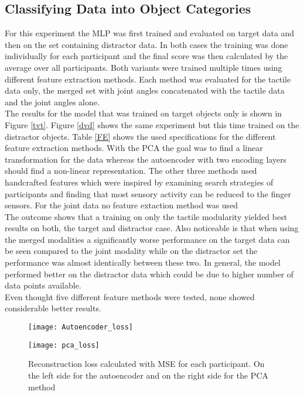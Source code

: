 \subsection{Classifying Data into Object Categories}\label{e2}
For this experiment the MLP was first trained and evaluated on target data and then on the set containing distractor data. In both cases the training was done individually for each participant and the final score was then calculated by the average over all participants. Both variants were trained multiple times using different feature extraction methods. Each method was evaluated for the tactile data only, the merged set with joint angles concatenated with the tactile data and the joint angles alone.\\ 
The results for the model that was trained on target objects only is shown in Figure \ref{tvt}. Figure \ref{dvd} shows the same experiment but this time trained on the distractor objects. Table \ref{FE} shows the used specifications for the different feature extraction methods. With the PCA the goal was to find a linear transformation for the data whereas the autoencoder with two encoding layers should find a non-linear representation. The other three methods used handcrafted features which were inspired by examining search strategies of participants and finding that most sensory activity can be reduced to the finger sensors. For the joint data no feature extaction method was used \\
The outcome shows that a training on only the tactile modularity yielded best results on both, the target and distractor case. Also noticeable is that when using the merged modalities a significantly worse performance on the target data can be seen compared to the joint modality while on the distractor set the performance was almost identically between these two. In general, the model performed better on the distractor data which could be due to higher number of data points available.\\
Even thought five different feature methods were tested, none showed considerable better results. 

\begin{figure}[H]
	\centering
	\begin{minipage}{0.495\textwidth}
		\centering
		\texttt{[image: Autoencoder\_loss]}
	\end{minipage}
	\begin{minipage}{0.495\textwidth}
		\centering
		\texttt{[image: pca\_loss]}
	\end{minipage}
	\caption{Reconstruction loss calculated with MSE for each participant. On the left side for the autoencoder and on the right side for the PCA method}
	\label{ae_pca_loss}
\end{figure}


